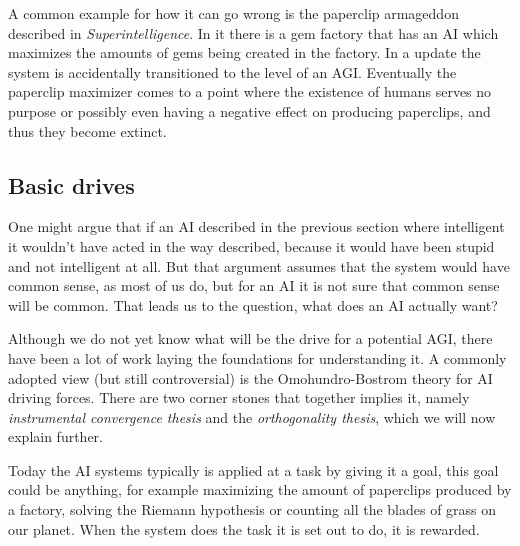 \documentclass[12pt,A4]{report}
\theoremstyle{definition}
\begin{document}
A common example for how it can go wrong is the paperclip armageddon described in \textit{Superintelligence}. In it there is a gem factory that has an AI which maximizes the amounts of gems being created in the factory. In a update the system is accidentally transitioned to the level of an AGI. Eventually the paperclip maximizer comes to a point where the existence of humans serves no purpose or possibly even having a negative effect on producing paperclips, and thus they become extinct. 

\subsection{Basic drives}
One might argue that if an AI described in the previous section where intelligent it wouldn't have acted in the way described, because it would have been stupid and not intelligent at all. But that argument assumes that the system would have common sense, as most of us do, but for an AI it is not sure that common sense will be common. That leads us to the question, what does an AI actually want?

Although we do not yet know what will be the drive for a potential AGI, there have been a lot of work laying the foundations for understanding it. A commonly adopted view (but still controversial) is the Omohundro-Bostrom theory for AI driving forces. There are two corner stones that together implies it, namely \textit{instrumental convergence thesis} and the \textit{orthogonality thesis}, which we will now explain further.

Today the AI systems typically is applied at a task by giving it a goal, this goal could be anything, for example maximizing the amount of paperclips produced by a factory, solving the Riemann hypothesis or counting all the blades of grass on our planet. When the system does the task it is set out to do, it is rewarded.
\end{document}
